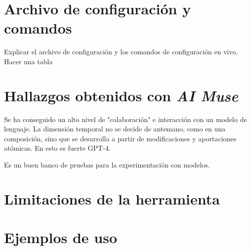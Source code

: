
\section{Archivo de configuración y comandos}

Explicar el archivo de configuración y los comandos de configuración en vivo. Hacer una tabla



\section{Hallazgos obtenidos con \emph{AI Muse}}

Se ha conseguido un alto nivel de "colaboración" e interacción con un modelo de lenguaje. La dimensión temporal no se decide de antemano, como en una composición, sino que se desarrolla a partir de modificaciones y aportaciones atómicas. En esto es fuerte GPT-4.

Es un buen banco de pruebas para la experimentación con modelos. 

\section{Limitaciones de la herramienta}

\section{Ejemplos de uso}